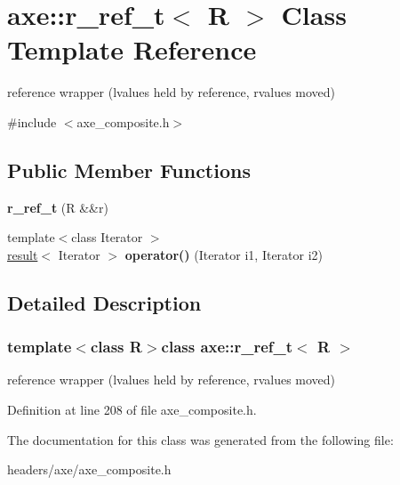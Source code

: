 \hypertarget{classaxe_1_1r__ref__t}{\section{axe\+:\+:r\+\_\+ref\+\_\+t$<$ R $>$ Class Template Reference}
\label{classaxe_1_1r__ref__t}
}


reference wrapper (lvalues held by reference, rvalues moved)  




{\ttfamily \#include $<$axe\+\_\+composite.\+h$>$}

\subsection*{Public Member Functions}
\begin{DoxyCompactItemize}
\item 
\hypertarget{classaxe_1_1r__ref__t_a3eacaeba8c139087391ef656b67a696c}{{\bfseries r\+\_\+ref\+\_\+t} (R \&\&r)}\label{classaxe_1_1r__ref__t_a3eacaeba8c139087391ef656b67a696c}

\item 
\hypertarget{classaxe_1_1r__ref__t_a92670abc0f6a5cfdeb4708e300a35b3c}{{\footnotesize template$<$class Iterator $>$ }\\\hyperlink{structaxe_1_1result}{result}$<$ Iterator $>$ {\bfseries operator()} (Iterator i1, Iterator i2)}\label{classaxe_1_1r__ref__t_a92670abc0f6a5cfdeb4708e300a35b3c}

\end{DoxyCompactItemize}


\subsection{Detailed Description}
\subsubsection*{template$<$class R$>$class axe\+::r\+\_\+ref\+\_\+t$<$ R $>$}

reference wrapper (lvalues held by reference, rvalues moved) 

Definition at line 208 of file axe\+\_\+composite.\+h.



The documentation for this class was generated from the following file\+:\begin{DoxyCompactItemize}
\item 
headers/axe/axe\+\_\+composite.\+h\end{DoxyCompactItemize}
